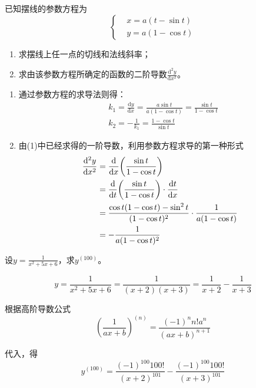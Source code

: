 \begin{problem}
	已知摆线的参数方程为
	\begin{equation*}
		\left\{
		\begin{aligned}
			&x=a(t-\sin{t})\\
			&y=a(1-\cos{t})
		\end{aligned}
		\right.
	\end{equation*}
    \begin{enumerate}[label=(\arabic*)]
    	\item 求摆线上任一点的切线和法线斜率；
    	\item 求由该参数方程所确定的函数的二阶导数$\frac{\mathrm{d}^2y}{\mathrm{d}x^2}$。
    \end{enumerate}
    
    \begin{solution}
    	\begin{enumerate}[label=(\arabic*)]
    		\item 通过参数方程的求导法则得：
    		\begin{align*}
    			&k_1=\frac{\mathrm{d}y}{\mathrm{d}x}=\frac{a\sin{t}}{a(1-\cos{t})}=\frac{\sin{t}}{1-\cos{t}}\\
    			&k_2=-\frac{1}{k_1}=\frac{1-\cos{t}}{\sin{t}}
    		\end{align*}
    		\item 由(1)中已经求得的一阶导数，利用参数方程求导的第一种形式
    		\begin{align*}
    			\frac{\mathrm{d}^2y}{\mathrm{d}x^2}&=\frac{\mathrm{d}}{\mathrm{d}x}\qty(\frac{\sin{t}}{1-\cos{t}})\\
    			&=\frac{\mathrm{d}}{\mathrm{d}t}\qty(\frac{\sin{t}}{1-\cos{t}})\cdot\frac{\mathrm{d}t}{\mathrm{d}x}\\
    			&=\frac{\cos{t}(1-\cos{t})-\sin^2{t}}{(1-\cos{t})^2}\cdot\frac{1}{a(1-\cos{t})}\\
    			&=-\frac{1}{a(1-\cos{t})^2}
    		\end{align*}
    	\end{enumerate}
    \end{solution}
\end{problem}

\begin{problem}
	设$y=\frac{1}{x^2+5x+6}$，求$y^{(100)}$。
	
	\begin{solution}
		\[y=\frac{1}{x^2+5x+6}=\frac{1}{(x+2)(x+3)}=\frac{1}{x+2}-\frac{1}{x+3}\]
		
		根据高阶导数公式
		\[(\frac{1}{ax+b})^{(n)}=\frac{(-1)^nn!a^n}{(ax+b)^{n+1}}\]
		
		代入，得
		\[y^{(100)}=\frac{(-1)^{100}100!}{(x+2)^{101}}-\frac{(-1)^{100}100!}{(x+3)^{101}}\]
	\end{solution}
\end{problem}


